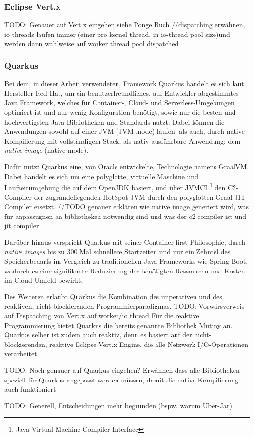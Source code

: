 \subsubsection{Eclipse Vert.x}
\label{section:Vert.x}
\parencite{VertxArticle}
TODO: Genauer auf Vert.x eingehen siehe Ponge Buch
\parencite{Vert.xDocs}
//dispatching erwähnen, io threads laufen immer (einer pro kernel thread, in io-thread pool size)und werden dann wahlweise auf worker thread pool dispatched
\subsubsection{Quarkus}
\label{section:Quarkus}

Bei dem, in dieser Arbeit verwendeten, Framework Quarkus handelt es sich laut Hersteller Red Hat, um ein
benutzerfreundliches, auf Entwickler abgestimmtes Java Framework, welches für Container-, Cloud- und Serverless-Umgebungen optimiert ist und nur wenig
Konfiguration benötigt, sowie nur die besten und hochwertigsten Java-Bibliotheken und Standards nutzt.
Dabei können die Anwendungen sowohl auf einer JVM (JVM mode) laufen, als auch, durch native Kompilierung mit vollständigem Stack,
als nativ ausführbare Anwendung: dem \textit{native image} (native mode).

Dafür nutzt Quarkus eine, von Oracle entwickelte, Technologie namens GraalVM.
Dabei handelt es sich um eine polyglotte, virtuelle Maschine und Laufzeitumgebung die auf dem OpenJDK basiert, und über
JVMCI \footnote{Java Virtual Machine Compiler Interface} den C2-Compiler der zugrundeliegenden HotSpot-JVM durch den polyglotten Graal JIT-Compiler ersetzt.\parencite{GraalVM}
//TODO genauer erklären wie native image generiert wird, was für anpassugnen an bibliotheken notwendig sind und was der c2 compiler ist und jit compiler

Darüber hinaus verspricht Quarkus mit seiner Container-first-Philosophie, durch \textit{native images} bis zu 300 Mal schnellere Startzeiten
und nur ein Zehntel des
Speicherbedarfs im Vergleich zu traditionellen Java-Frameworks wie Spring Boot, wodurch es eine signifikante Reduzierung der benötigten Ressourcen und Kosten
im Cloud-Umfeld bewirkt. \parencite{RedHatQuarkusInfografik}

Des Weiteren erlaubt Quarkus die Kombination des imperativen und des reaktiven, nicht-blockierenden Programmierparadigmas.
TODO: Vorwärsverweis auf Dispatching von Vert.x auf worker/io thread
Für die reaktive Programmierung bietet Quarkus die bereits genannte Bibliothek Mutiny an.
Quarkus selber ist zudem auch reaktiv, denn es basiert auf der nicht-blockierenden, reaktive Eclipse Vert.x Engine, die
alle Netzwerk I/O-Operationen verarbeitet. \parencite{QuarkusReactiveGettingStarted, Quarkus}

TODO: Noch genauer auf Quarkus eingehen? Erwähnen dass alle Bibliotheken speziell für Quarkus angepasst werden müssen, damit
die native Kompilierung auch funktioniert

TODO: Generell, Entscheidungen mehr begründen (bspw. warum Uber-Jar)